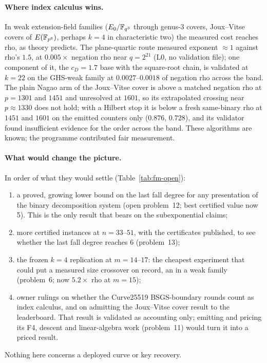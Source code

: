 \paragraph{Where index calculus wins.} In weak extension-field families
($E_0/\mathbb{F}_{q^3}$ through genus-3 covers, Joux--Vitse covers of
$E(\mathbb{F}_{p^6})$, perhaps $k=4$ in characteristic two) the measured cost
reaches rho, as theory predicts. The plane-quartic route measured exponent
$\approx1$ against rho's $1.5$, at $0.005\times$ negation rho near
$q=2^{21}$ (L0, no validation file); one component of it, the
$c_D=1.7$ base with the square-root chain, is validated at $k=22$ on the
GHS-weak family at $0.0027$--$0.0018$ of negation rho across the band. The
plain Nagao arm of the Joux--Vitse cover is above a matched negation rho at
$p=1301$ and $1451$ and unresolved at $1601$, so its extrapolated crossing
near $p\approx1330$ does not hold; with a Hilbert stop it is below a fresh
same-binary rho at $1451$ and $1601$ on the emitted counters only
($0.876$, $0.728$), and its validator found insufficient evidence for the
order across the band. These algorithms are known; the programme contributed fair
measurement.

\paragraph{What would change the picture.} In order of what they would
settle (Table~\ref{tab:fm-open}):
\begin{enumerate}
\item a proved, growing lower bound on the last fall degree for any
  presentation of the binary decomposition system (open problem~12; best
  certified value now 5). This is the only result that bears on the
  subexponential claims;
\item more certified instances at $n=33$--$51$, with the certificates
  published, to see whether the last fall degree reaches 6 (problem~13);
\item the frozen $k=4$ replication at $m=14$--$17$: the cheapest
  experiment that could put a measured size crossover on record, an
   in a weak family (problem~6; now $5.2\times$ rho at
  $m=15$);
\item owner rulings on whether the Curve25519 BSGS-boundary rounds count
  as index calculus, and on admitting the Joux--Vitse cover result to the
  leaderboard. That result is validated as accounting only; emitting and
  pricing its F4, descent and linear-algebra work (problem~11) would turn
  it into a priced result.
\end{enumerate}
Nothing here concerns a deployed curve or key recovery.
